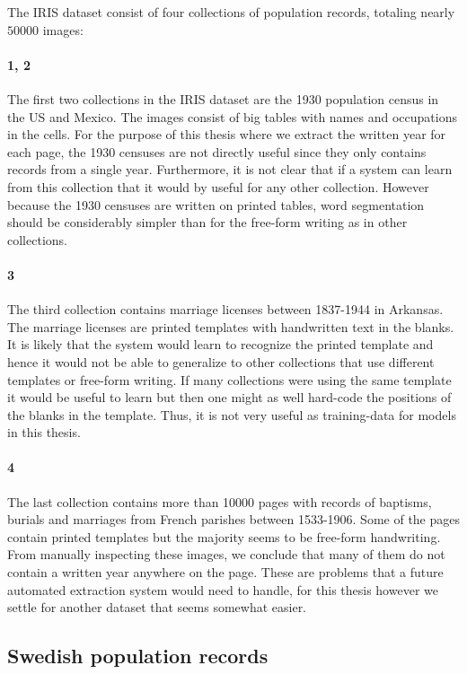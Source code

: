 The IRIS dataset consist of four collections of population records, totaling nearly $50000$ images:

\paragraph{1, 2}
The first two collections in the IRIS dataset are the 1930 population census in the US and Mexico. The images consist of big tables with names and occupations in the cells.
For the purpose of this thesis where we extract the written year for each page, the 1930 censuses are not directly useful since they only contains records from a single year. Furthermore, it is not clear that if a system can learn from this collection that it would by useful for any other collection.
However because the 1930 censuses are written on printed tables, word segmentation should be considerably simpler than for the free-form writing as in other collections.

\paragraph{3}
The third collection contains marriage licenses between 1837-1944 in Arkansas. The marriage licenses are printed templates with handwritten text in the blanks.
It is likely that the system would learn to recognize the printed template and hence it would not be able to generalize to other collections that use different templates or free-form writing. If many collections were using the same template it would be useful to learn but then one might as well hard-code the positions of the blanks in the template. Thus, it is not very useful as training-data for models in this thesis.

\paragraph{4}
The last collection contains more than 10000 pages with records of baptisms, burials and marriages from French parishes between 1533-1906. Some of the pages contain printed templates but the majority seems to be free-form handwriting.
From manually inspecting these images, we conclude that many of them do not contain a written year anywhere on the page. These are problems that a future automated extraction system would need to handle, for this thesis however we settle for another dataset that seems somewhat easier.


\subsection{Swedish population records}

